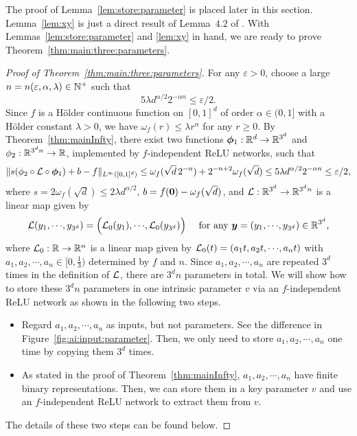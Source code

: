 \documentclass[nohyperref]{article}
\theoremstyle{plain}
\theoremstyle{definition}
\theoremstyle{remark}
\begin{document}
The proof of Lemma~\ref{lem:store:parameter} is placed later in this section. Lemma~\ref{lem:xy} is just a direct result of Lemma~$4.2$ of \cite{shijun3}.
With Lemmas~\ref{lem:store:parameter} and \ref{lem:xy} in hand, we are ready to  prove Theorem~\ref{thm:main:three:parameters}.
\begin{proof}[Proof of Theorem~\ref{thm:main:three:parameters}]
	For any $\varepsilon>0$, choose a large $n=n(\varepsilon,\alpha,\lambda)\in \N^+$ such that
	\begin{equation*}
		5\lambda d^{\alpha/2} 2^{-\alpha n}\le \varepsilon/2.
	\end{equation*}
	Since $f$ is a H\"older continuous function on $[0,1]^d$ of order $\alpha\in (0,1]$ with a H\"older constant $\lambda>0$, we have $\omega_f(r)\le \lambda r^{\alpha}$ for any $r\ge 0$.
	By Theorem~\ref{thm:mainInfty}, 
	there exist two functions $\bmphi_1:\R^d\to \R^{3^d}$ and $\phi_2:\R^{3^dn}\to \R$, implemented by $f$-independent ReLU networks, such that
	\begin{equation}\label{eq:error1}
		\|s(\phi_2\circ {\mathcal{L}} \circ{\bm{\phi}}_1)+b-f\|_{L^\infty([0,1]^d)}\le \omega_f(\sqrt{d}\, 2^{-n})+2^{-n+2}\omega_f(\sqrt{d})
		\le 5\lambda d^{\alpha/2} 2^{-\alpha n}\le \varepsilon/2,
	\end{equation}
	where $s=2\omega_f(\sqrt{d})\le 2\lambda d^{\alpha/2}$, $b=f({\bm{0}})-\omega_f(\sqrt{d})$, and $\calL:\R^{3^d}\to \R^{3^dn}$ is a linear map given by \[\calL(y_1,\cdots,y_{3^d})=\Big(\calL_0(y_1),\cdots,\calL_0(y_{3^d})\Big)\quad \tn{ for any $\bmy=(y_1,\cdots,y_{3^d})\in \R^{3^d}$,}\]
	where $\calL_0:\R\to \R^n$ is a linear map given by $\calL_0(t)=(a_1t, a_2 t,\cdots,a_n t)$ with $a_1,a_2,\cdots,a_n\in [0,\tfrac{1}{3})$ determined by $f$ and $n$. 
	Since $a_1,a_2,\cdots,a_n$ are repeated $3^d$ times in the definition of ${\mathcal{L}}$, there are $3^d n$ parameters in total. We will show how to store these $3^dn$ parameters in one intrinsic parameter $v$ via an $f$-independent ReLU network as shown in the following two steps.
	\begin{itemize}
		\item Regard $a_1,a_2,\cdots,a_n$ as inputs, but not parameters. See the difference in Figure~\ref{fig:ai:input:parameter}. 
		Then, we only need to store $a_1,a_2,\cdots,a_n$ one time by  copying them $3^d$ times. 
		\item  As stated in the proof of Theorem~\ref{thm:mainInfty}, $a_1,a_2,\cdots,a_n$ have finite binary representations. Then, we can store them in a key parameter $v$ and use  an $f$-independent ReLU network to extract them from $v$.
	\end{itemize}
	The details of these two steps can be found below.
	

\end{proof}
\end{document}
